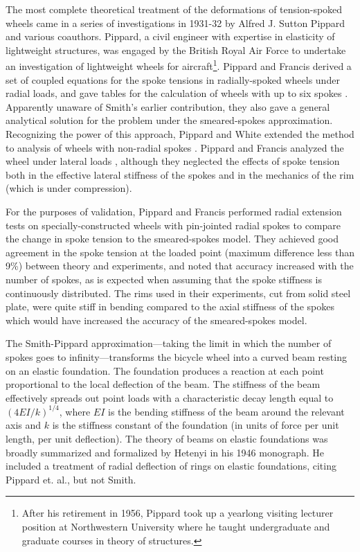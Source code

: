 \documentclass[../thesis.tex]{subfiles}
\begin{document}
The most complete theoretical treatment of the deformations of tension-spoked wheels came in a series of investigations in 1931-32 by Alfred J. Sutton Pippard and various coauthors. Pippard, a civil engineer with expertise in elasticity of lightweight structures, was engaged by the British Royal Air Force to undertake an investigation of lightweight wheels for aircraft\footnote{After his retirement in 1956, Pippard took up a yearlong visiting lecturer position at Northwestern University where he taught undergraduate and graduate courses in theory of structures.}. Pippard and Francis derived a set of coupled equations for the spoke tensions in radially-spoked wheels under radial loads, and gave tables for the calculation of wheels with up to six spokes \cite{PippardRad}. Apparently unaware of Smith's earlier contribution, they also gave a general analytical solution for the problem under the smeared-spokes approximation. Recognizing the power of this approach, Pippard and White extended the method to analysis of wheels with non-radial spokes \cite{PippardRadTan}. Pippard and Francis analyzed the wheel under lateral loads \cite{PippardLat}, although they neglected the effects of spoke tension both in the effective lateral stiffness of the spokes and in the mechanics of the rim (which is under compression).

For the purposes of validation, Pippard and Francis performed radial extension tests on specially-constructed wheels with pin-jointed radial spokes to compare the change in spoke tension to the smeared-spokes model. They achieved good agreement in the spoke tension at the loaded point (maximum difference less than 9\%) between theory and experiments, and noted that accuracy increased with the number of spokes, as is expected when assuming that the spoke stiffness is continuously distributed. The rims used in their experiments, cut from solid steel plate, were quite stiff in bending compared to the axial stiffness of the spokes which would have increased the accuracy of the smeared-spokes model.

The Smith-Pippard approximation---taking the limit in which the number of spokes goes to infinity---transforms the bicycle wheel into a curved beam resting on an elastic foundation. The foundation produces a reaction at each point proportional to the local deflection of the beam. The stiffness of the beam effectively spreads out point loads with a characteristic decay length equal to $(4EI/k)^{1/4}$, where $EI$ is the bending stiffness of the beam around the relevant axis and $k$ is the stiffness constant of the foundation (in units of force per unit length, per unit deflection). The theory of beams on elastic foundations was broadly summarized and formalized by Hetenyi \cite{Hetenyi} in his 1946 monograph. He included a treatment of radial deflection of rings on elastic foundations, citing Pippard et. al., but not Smith.
\end{document}
